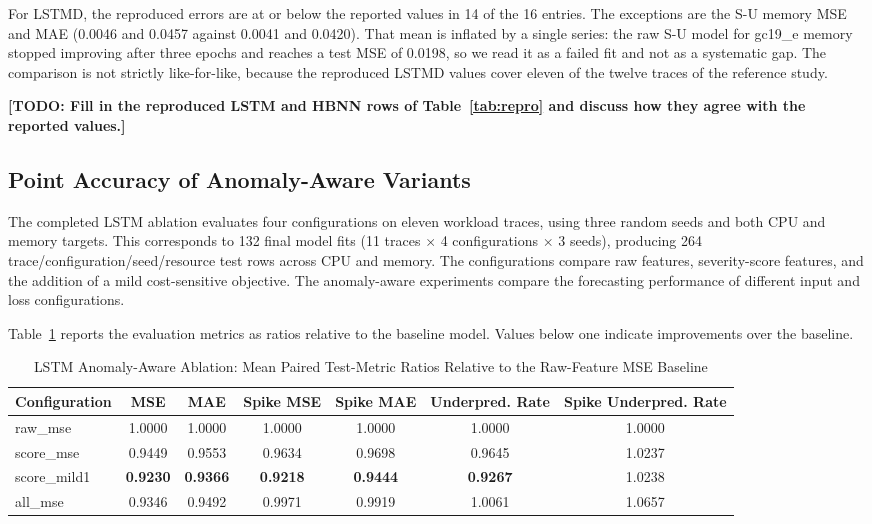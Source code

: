 \documentclass[conference]{IEEEtran}
\newcommand{\todo}[1]{{\color{red}\textbf{[TODO: #1]}}}
\begin{document}
For LSTMD, the reproduced errors are at or below the reported values in 14 of the 16 entries. The exceptions are the S-U memory MSE and MAE (0.0046 and 0.0457 against 0.0041 and 0.0420). That mean is inflated by a single series: the raw S-U model for gc19\_e memory stopped improving after three epochs and reaches a test MSE of 0.0198, so we read it as a failed fit and not as a systematic gap. The comparison is not strictly like-for-like, because the reproduced LSTMD values cover eleven of the twelve traces of the reference study.

\todo{Fill in the reproduced LSTM and HBNN rows of Table~\ref{tab:repro} and discuss how they agree with the reported values.}

\subsection{Point Accuracy of Anomaly-Aware Variants}

The completed LSTM ablation evaluates four configurations on eleven workload traces, using three random seeds and both CPU and memory targets. This corresponds to 132 final model fits (11 traces $\times$ 4 configurations $\times$ 3 seeds), producing 264 trace/configuration/seed/resource test rows across CPU and memory. The configurations compare raw features, severity-score features, and the addition of a mild cost-sensitive objective. The anomaly-aware experiments compare the forecasting performance of different input and loss configurations.

Table~\ref{tab:point} reports the evaluation metrics as ratios relative to the baseline model. Values below one indicate improvements over the baseline.

\begin{table}[!t]
\caption{LSTM Anomaly-Aware Ablation: Mean Paired Test-Metric Ratios Relative to the Raw-Feature MSE Baseline}
\label{tab:point}
\centering
\footnotesize
\begin{tabular}{lcccccc}
\toprule
\textbf{Configuration} & \textbf{MSE} & \textbf{MAE} &
\textbf{Spike MSE} & \textbf{Spike MAE} &
\textbf{Underpred. Rate} & \textbf{Spike Underpred. Rate}\\
\midrule
raw\_mse      & 1.0000 & 1.0000 & 1.0000 & 1.0000 & 1.0000 & 1.0000\\
score\_mse    & 0.9449 & 0.9553 & 0.9634 & 0.9698 & 0.9645 & 1.0237\\
score\_mild1  & \textbf{0.9230} & \textbf{0.9366} & \textbf{0.9218} & \textbf{0.9444} & \textbf{0.9267} & 1.0238\\
all\_mse      & 0.9346 & 0.9492 & 0.9971 & 0.9919 & 1.0061 & 1.0657\\
\bottomrule
\end{tabular}
\end{table}
\end{document}
